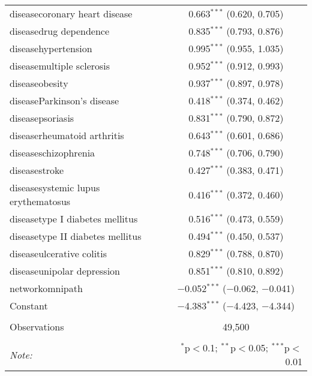 \begin{table}[!htbp]
\begin{tabular}{@{\extracolsep{5pt}}lc}
  diseasecoronary heart disease & 0.663$^{***}$ (0.620, 0.705) \\ 
  diseasedrug dependence & 0.835$^{***}$ (0.793, 0.876) \\ 
  diseasehypertension & 0.995$^{***}$ (0.955, 1.035) \\ 
  diseasemultiple sclerosis & 0.952$^{***}$ (0.912, 0.993) \\ 
  diseaseobesity & 0.937$^{***}$ (0.897, 0.978) \\ 
  diseaseParkinson's disease & 0.418$^{***}$ (0.374, 0.462) \\ 
  diseasepsoriasis & 0.831$^{***}$ (0.790, 0.872) \\ 
  diseaserheumatoid arthritis & 0.643$^{***}$ (0.601, 0.686) \\ 
  diseaseschizophrenia & 0.748$^{***}$ (0.706, 0.790) \\ 
  diseasestroke & 0.427$^{***}$ (0.383, 0.471) \\ 
  diseasesystemic lupus erythematosus & 0.416$^{***}$ (0.372, 0.460) \\ 
  diseasetype I diabetes mellitus & 0.516$^{***}$ (0.473, 0.559) \\ 
  diseasetype II diabetes mellitus & 0.494$^{***}$ (0.450, 0.537) \\ 
  diseaseulcerative colitis & 0.829$^{***}$ (0.788, 0.870) \\ 
  diseaseunipolar depression & 0.851$^{***}$ (0.810, 0.892) \\ 
  networkomnipath & $-$0.052$^{***}$ ($-$0.062, $-$0.041) \\ 
  Constant & $-$4.383$^{***}$ ($-$4.423, $-$4.344) \\ 
 \hline \\[-1.8ex] 
Observations & 49,500 \\ 
\hline 
\hline \\[-1.8ex] 
\textit{Note:}  & \multicolumn{1}{r}{$^{*}$p$<$0.1; $^{**}$p$<$0.05; $^{***}$p$<$0.01} \\ 
\end{tabular} 
\end{table} 
